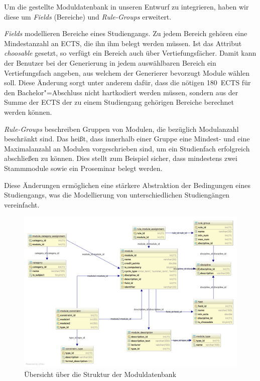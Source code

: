 Um die gestellte Moduldatenbank in unseren Entwurf zu integrieren, haben wir diese um \textit{Fields} (Bereiche) und \textit{Rule-Groups} erweitert.

\textit{Fields} modellieren Bereiche eines Studiengangs. Zu jedem Bereich gehören eine Mindestanzahl an ECTS, die ihn ihm belegt werden müssen. Ist das Attribut \textit{choosable} gesetzt, so verfügt ein Bereich auch über Vertiefungsfächer. Damit kann der Benutzer bei der Generierung in jedem auswählbaren Bereich ein Vertiefungsfach angeben, aus welchem der Generierer bevorzugt Module wählen soll. Diese Änderung sorgt unter anderem dafür, dass die nötigen 180~ECTS für den Bachelor"=Abschluss nicht hartkodiert werden müssen, sondern aus der Summe der ECTS der zu einem Studiengang gehörigen Bereiche berechnet werden können.

\textit{Rule-Groups} beschreiben Gruppen von Modulen, die bezüglich Modulanzahl beschränkt sind. Das heißt, dass innerhalb einer Gruppe eine Mindest- und eine Maximalanzahl an Modulen vorgeschrieben sind, um ein Studienfach erfolgreich abschließen zu können. Dies stellt zum Beispiel sicher, dass mindestens zwei Stammmodule sowie ein Proseminar belegt werden.

Diese Änderungen ermöglichen eine stärkere Abstraktion der Bedingungen eines Studiengangs, was die Modellierung von unterschiedlichen Studiengängen vereinfacht.

\begin{figure}
	\includegraphics[width = \textwidth]{diagrams/module_diagram.png}
	\caption{Übersicht über die Struktur der Moduldatenbank}
\end{figure}